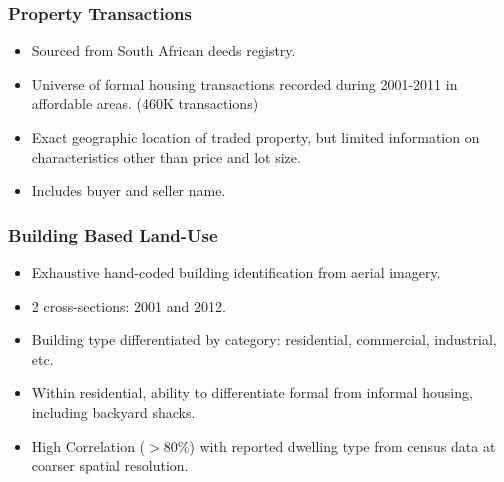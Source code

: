 \documentclass[aspectratio=149]{beamer}
\begin{document}

\begin{frame}
\frametitle{Property Transactions}

\begin{itemize}

  \item Sourced from South African deeds registry. 
  \vspace{2mm}
  \item Universe of formal housing transactions recorded during 2001-2011 in
affordable areas. (460K transactions)
  \vspace{2mm}
  \item Exact geographic location of traded property, but limited information
on characteristics other than price and lot size.
  \vspace{2mm}
  \item Includes buyer and seller name.
\end{itemize}
\end{frame}


\begin{frame}
\frametitle{Building Based Land-Use}

\begin{itemize}

  \item Exhaustive hand-coded building identification  from aerial imagery. 
  \vspace{2mm}
  \item 2 cross-sections: 2001 and 2012. 
  \vspace{2mm}
  \item Building type differentiated by category: residential, commercial, industrial, etc.
  \vspace{2mm}
  \item Within residential, ability to differentiate formal from informal housing, including backyard shacks.
  \vspace{2mm}
  \item High Correlation ($>$80\%) with reported dwelling type from census data at coarser spatial resolution.
\end{itemize}
\end{frame}

\end{document}
